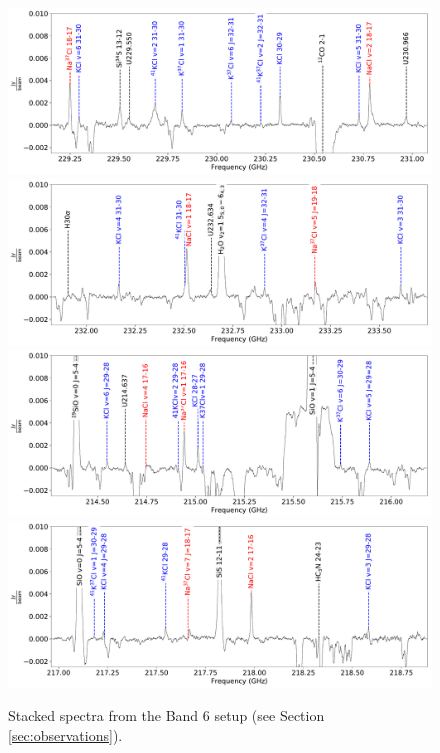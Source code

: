 \documentclass[twocolumn]{aastex62}
\begin{document}
\begin{figure}[!htp]
\includegraphics[scale=1,width=5.5in]{figures/color_labels_OrionSourceI_B6_spw0_robust0.5.pdf}
\includegraphics[scale=1,width=5.5in]{figures/color_labels_OrionSourceI_B6_spw1_robust0.5.pdf}
\includegraphics[scale=1,width=5.5in]{figures/color_labels_OrionSourceI_B6_spw2_robust0.5.pdf}
\includegraphics[scale=1,width=5.5in]{figures/color_labels_OrionSourceI_B6_spw3_robust0.5.pdf}
\caption{Stacked spectra from the Band 6 setup (see Section \ref{sec:observations}).}
\label{fig:spectrab6}
\end{figure}
\end{document}
